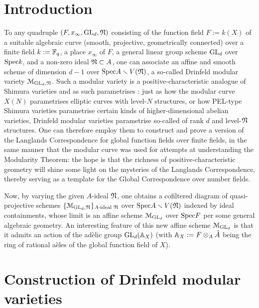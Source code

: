     \section{Introduction}
        To any quadruple $(F, x_{\infty}, \operatorname{GL}_d, \mathfrak{N})$ consisting of the function field $F := k(X)$ of a suitable algebraic curve (smooth, projective, geometrically connected) over a finite field $k := \mathbb{F}_q$, a place $x_{\infty}$ of $F$, a general linear group scheme $\operatorname{GL}_d$ over $\mathrm{Spec} k$, and a non-zero ideal $\mathfrak{N} \subset A$, one can associate an affine and smooth scheme of dimension $d - 1$ over $\mathrm{Spec} A \smallsetminus V(\mathfrak{N})$, a so-called Drinfeld modular variety $\mathcal{M}_{\operatorname{GL}_d, \mathfrak{N}}$. Such a modular variety is a positive-characteristic analogue of Shimura varieties and as such parametrises : just as how the modular curve $X(N)$ parametrises elliptic curves with level-$N$ structures, or how PEL-type Shimura varieties parametrise certain kinds of higher-dimensional abelian varieties, Drinfeld modular varieties parametrise so-called  of rank $d$ and level-$\mathfrak{N}$ structures. One can therefore employ them to construct and prove a version of the Langlands Correspondence for global function fields over finite fields, in the same manner that the modular curve was used for attempts at understanding the Modularity Theorem: the hope is that the richness of positive-characteristic geometry will shine some light on the mysteries of the Langlands Correspondence, thereby serving as a template for the Global Correspondence over number fields. 
        
        Now, by varying the given $A$-ideal $\mathfrak{N}$, one obtains a cofiltered diagram of quasi-projective schemes $\{\mathcal{M}_{\operatorname{GL}_d, \mathfrak{N}}\}_{\text{$A$-ideal $\mathfrak{N}$}}$ over $\mathrm{Spec} A \smallsetminus V(\mathfrak{N})$ indexed by ideal containments, whose limit is an affine scheme $\mathcal{M}_{\operatorname{GL}_d}$ over $\mathrm{Spec} F$ per some general algebraic geometry. An interesting feature of this new affine scheme $\mathcal{M}_{\operatorname{GL}_d}$ is that it admits an action of the ad\`elic group $\operatorname{GL}_d(\mathbb{A}_X)$ (with $\A_X := F \tensor_A \hat{A}$ being the ring of rational a\`eles of the global function field of $X$). 

    \section{Construction of Drinfeld modular varieties}

